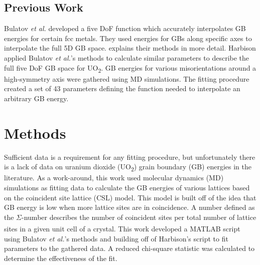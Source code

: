 \documentclass[twoside,senior]{BYUPhys}
\begin{document}
\section{Previous Work\label{intro:prevWork}}
Bulatov \emph{et al.}\cite{bulatov2014} developed a five DoF function which accurately interpolates GB energies for certain fcc metals.  They used energies for GBs along specific axes to interpolate the full 5D GB space.   explains their methods in more detail.  Harbison\cite{harbison2015} applied Bulatov \emph{et al.}'s methods to calculate similar parameters to describe the full five DoF GB space for UO\textsubscript{2}.  GB energies for various misorientations around a high-symmetry axis were gathered using MD simulations.  The fitting procedure created a set of 43 parameters defining the function needed to interpolate an arbitrary GB energy.

\chapter{Methods\label{methods}}
Sufficient data is a requirement for any fitting procedure, but unfortunately there is a lack of data on uranium dioxide (UO\textsubscript{2}) grain boundary (GB) energies in the literature.  As a work-around, this work used molecular dynamics (MD) simulations\cite{zhang2016,hansen2016} as fitting data to calculate the GB energies of various lattices based on the coincident site lattice (CSL) model. This model is built off of the idea that GB energy is low when more lattice sites are in coincidence.  A number defined as the $\Sigma$-number describes the number of coincident sites per total number of lattice sites in a given unit cell of a crystal.\cite{lejcek2010, rohrer2011} This work developed a MATLAB\textsuperscript{\textregistered} script using Bulatov \emph{et al.}'s methods\cite{bulatov2014} and building off of Harbison's\cite{harbison2015} script to fit parameters to the gathered data.  A reduced chi-square statistic was calculated to determine the effectiveness of the fit.
\end{document}
